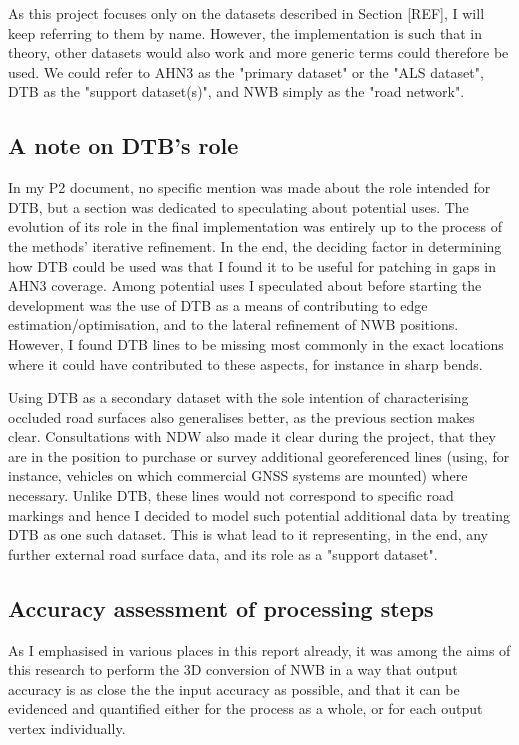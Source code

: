 As this project focuses only on the datasets described in Section [REF], I will keep referring to them by name. However, the implementation is such that in theory, other datasets would also work and more generic terms could therefore be used. We could refer to AHN3 as the "primary dataset" or the "ALS dataset", DTB as the "support dataset(s)", and NWB simply as the "road network".

\subsection{A note on DTB's role}
\label{sub:generalisation}

In my P2 document, no specific mention was made about the role intended for DTB, but a section was dedicated to speculating about potential uses. The evolution of its role in the final implementation was entirely up to the process of the methods' iterative refinement. In the end, the deciding factor in determining how DTB could be used was that I found it to be useful for patching in gaps in AHN3 coverage. Among potential uses I speculated about before starting the development was the use of DTB as a means of contributing to edge estimation/optimisation, and to the lateral refinement of NWB positions. However, I found DTB lines to be missing most commonly in the exact locations where it could have contributed to these aspects, for instance in sharp bends.

Using DTB as a secondary dataset with the sole intention of characterising occluded road surfaces also generalises better, as the previous section makes clear. Consultations with NDW also made it clear during the project, that they are in the position to purchase or survey additional georeferenced lines (using, for instance, vehicles on which commercial GNSS systems are mounted) where necessary. Unlike DTB, these lines would not correspond to specific road markings and hence I decided to model such potential additional data by treating DTB as one such dataset. This is what lead to it representing, in the end, any further external road surface data, and its role as a "support dataset".

\subsection{Accuracy assessment of processing steps}
\label{sub:accuracyoverview}

As I emphasised in various places in this report already, it was among the aims of this research to perform the 3D conversion of NWB in a way that output accuracy is as close the the input accuracy as possible, and that it can be evidenced and quantified either for the process as a whole, or for each output vertex individually.

